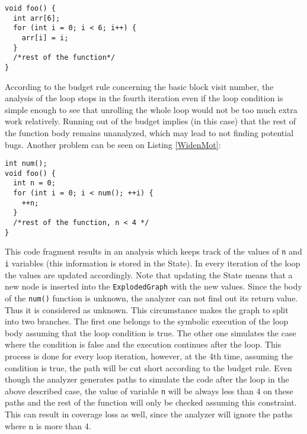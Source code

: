 \documentclass[oneside, a4paper, 12pt]{article}
\theoremstyle{definition}
\begin{document}
\begin{lstlisting}
void foo() {
  int arr[6];
  for (int i = 0; i < 6; i++) {
    arr[i] = i;
  }
  /*rest of the function*/
}\end{lstlisting}

According to the budget rule concerning the basic block visit number, the
analysis of the loop stops in the fourth iteration even if the loop 
condition is simple enough to see that unrolling the whole loop would not be 
too much extra work relatively. Running out of the budget implies (in this 
case) that the rest of the function body remains unanalyzed, which may lead to 
not finding potential bugs.
Another problem can be seen on Listing \ref{WidenMot}:
\begin{lstlisting}
int num();
void foo() {
  int n = 0;
  for (int i = 0; i < num(); ++i) {
    ++n;
  }
  /*rest of the function, n < 4 */
}\end{lstlisting}

This code fragment results in an analysis which keeps track of the values of 
\texttt{n} and \texttt{i} variables (this information is stored in the State). 
In every iteration of the loop the values are updated accordingly. Note that 
updating the
State means that a new node is inserted into the \texttt{ExplodedGraph} with the 
new 
values. Since the body of the \texttt{num()} function is unknown, the 
analyzer can not find out its return value. Thus it is considered as 
unknown. This circumstance
makes the graph to split into two branches. The first one belongs to the symbolic
execution of the loop body assuming that the loop condition is true. The 
other one simulates the case where the condition is false and the execution 
continues after the loop. This process is done for every loop iteration, 
however, at the 4th time, assuming the condition is true, the path will be cut 
short according to the budget rule.
Even though the analyzer generates paths to simulate the code after the loop 
in the above described case, the value of variable \texttt{n} will be 
always less than 4 on these paths and the rest of the function will only be 
checked assuming this constraint. This can result in coverage loss as well, 
since the analyzer will ignore the paths where n is more than 4.
\end{document}
